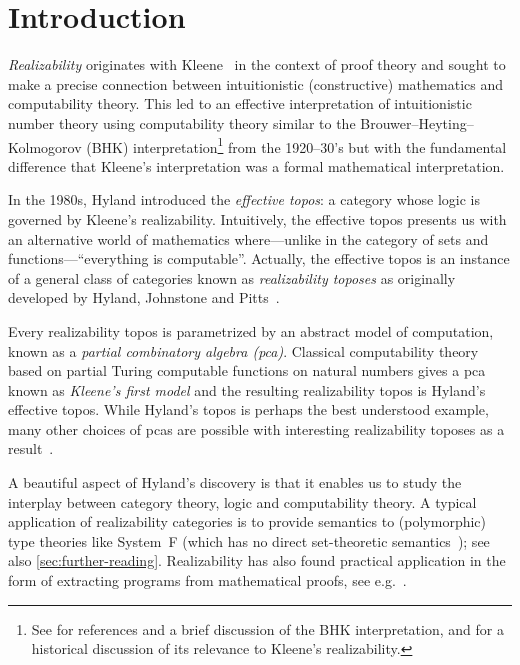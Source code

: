 \chapter{Introduction}

\emph{Realizability} originates with Kleene~\cite{Kleene1945} in the context of
proof theory and sought to make a precise connection between intuitionistic
(constructive) mathematics and computability theory.
%
This led to an effective interpretation of intuitionistic number theory using
computability theory similar to the Brouwer--Heyting--Kolmogorov (BHK)
interpretation\footnote{See \cite[\S3.1 and \S5.3, Sec.~3 and 5,
  Ch.~1]{TroelstraVanDalen1988} for references and a brief discussion of the
  BHK interpretation, and \cite[p.~241]{vanOosten2002} for a historical
  discussion of its relevance to Kleene's realizability.} from the 1920--30's but
with the fundamental difference that %
Kleene's interpretation was a formal mathematical interpretation.

In the 1980s, Hyland introduced the \emph{effective topos}: a category whose
logic is governed by Kleene's realizability.
%
Intuitively, the effective topos presents us with an alternative world of
mathematics where---unlike in the category of sets and functions---``everything is
computable''.
%
Actually, the effective topos is an instance of a general class of categories
known as \emph{realizability toposes} as originally developed by Hyland,
Johnstone and Pitts~\cite{HJP1980,Pitts1981}.

Every realizability topos is parametrized by an abstract model of computation,
known as a \emph{partial combinatory algebra (pca)}. Classical computability
theory based on partial Turing computable functions on natural numbers gives a
pca known as \emph{Kleene's first model} and the resulting realizability topos
is Hyland's effective topos.
%
While Hyland's topos is perhaps the best understood example, many other choices
of pcas are possible with interesting realizability toposes as a
result~\cite{vanOosten2008}.

A beautiful aspect of Hyland's discovery is that it enables us to study the
interplay between category theory, logic and computability theory.
%
A typical application of realizability categories is to provide semantics to
(polymorphic) type theories like System~F (which has no direct set-theoretic
semantics~\cite{Reynolds1984}); see also \cref{sec:further-reading}.
%
Realizability has also found practical application in the form of extracting
programs from mathematical proofs, see e.g.~\cite{Minlog}.

